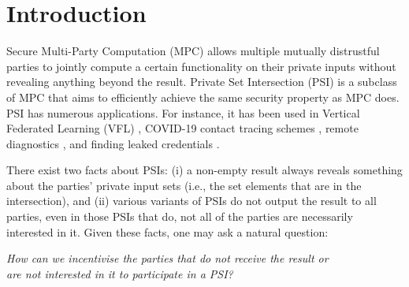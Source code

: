 






\section{Introduction}


Secure Multi-Party Computation (MPC)  allows multiple mutually distrustful parties to jointly compute a certain functionality on their private inputs without revealing anything beyond the result. Private Set Intersection (PSI) is a subclass of MPC that aims to efficiently achieve the same security property as MPC does. %
%
PSI has numerous applications. For instance, it has  been used  in Vertical Federated Learning (VFL) \cite{LuD20}, COVID-19 contact tracing schemes  \cite{DBLP:conf/asiacrypt/DuongPT20},  remote diagnostics \cite{BrickellPSW07}, and finding leaked credentials \cite{ThomasPYRKIBPPB19}. %



There exist two facts about PSIs: (i) a non-empty result always reveals something about the parties' private input sets (i.e., the set elements that are in the intersection), and (ii) various variants of PSIs do not output the result to all parties, even in those PSIs that do,  not all of the parties are necessarily interested in it.  Given these facts, one may ask a natural question:  




\begin{center}
\emph{How can we incentivise the parties that do not receive the result or\\ are not interested in it to participate in a PSI?}
\end{center}



